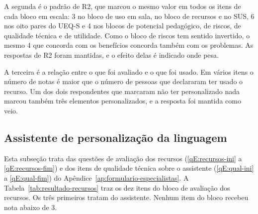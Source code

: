 A segunda é o padrão de R2, que marcou o mesmo valor em todos os itens de cada bloco em escala: 3 no bloco de uso em sala, no bloco de recursos e no SUS, 6 nos oito pares do UEQ-S e 4 nos blocos de potencial pedagógico, de riscos, de qualidade técnica e de utilidade. Como o bloco de riscos tem sentido invertido, o mesmo 4 que concorda com os benefícios concorda também com os problemas. As respostas de R2 foram mantidas, e o efeito delas é indicado onde pesa.

A terceira é a relação entre o que foi avaliado e o que foi usado. Em vários itens o número de notas é maior que o número de pessoas que declararam ter usado o recurso. Um dos dois respondentes que marcaram não ter personalizado nada marcou também três elementos personalizados, e a resposta foi mantida como veio.

\subsection{Assistente de personalização da linguagem}
\label{sec:resultado-assistente}

Esta subseção trata das questões de avaliação dos recursos (\ref{qE:recursos-ini} a \ref{qE:recursos-fim}) e dos itens de qualidade técnica sobre o assistente (\ref{qE:qual-ini} a \ref{qE:qual-fim}) do Apêndice~\ref{ap:formulario-especialistas}. A Tabela~\ref{tab:resultado-recursos} traz os dez itens do bloco de avaliação dos recursos. Os três primeiros tratam do assistente. Nenhum item do bloco recebeu nota abaixo de 3.

